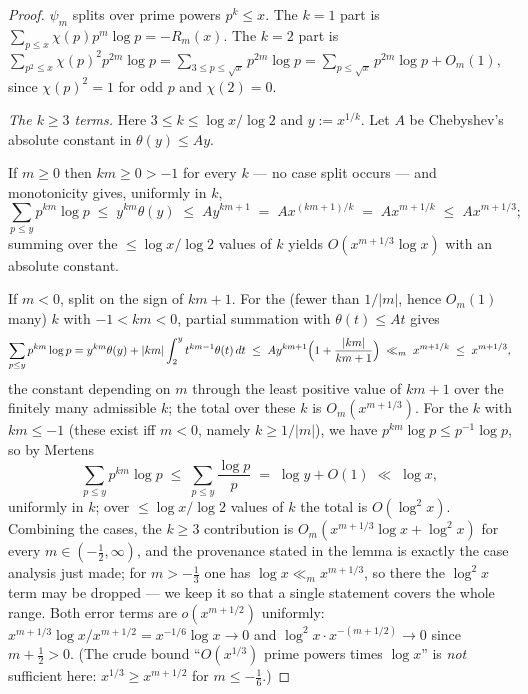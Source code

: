 \begin{proof}
$\psi_m$ splits over prime powers $p^k\le x$. The $k=1$ part is
$\sum_{p\le x}\chi(p)p^m\log p=-R_m(x)$. The $k=2$ part is
$\sum_{p^2\le x}\chi(p)^2p^{2m}\log p=\sum_{3\le p\le\sqrt x}p^{2m}\log p
=\sum_{p\le\sqrt x}p^{2m}\log p+O_m(1)$, since $\chi(p)^2=1$ for odd
$p$ and $\chi(2)=0$.

\emph{The $k\ge3$ terms.} Here $3\le k\le\log x/\log2$ and
$y:=x^{1/k}$. Let $A$ be Chebyshev's absolute constant in
$\theta(y)\le Ay$.

If $m\ge0$ then $km\ge0>-1$ for every $k$ --- no case split occurs ---
and monotonicity gives, uniformly in $k$,
\[
\sum_{p\le y}p^{km}\log p\;\le\;y^{km}\theta(y)\;\le\;Ay^{km+1}
\;=\;Ax^{(km+1)/k}\;=\;Ax^{m+1/k}\;\le\;Ax^{m+1/3};
\]
summing over the $\le\log x/\log2$ values of $k$ yields
$O(x^{m+1/3}\log x)$ with an absolute constant.

If $m<0$, split on the sign of $km+1$. For the (fewer than $1/|m|$,
hence $O_m(1)$ many) $k$ with $-1<km<0$, partial summation with
$\theta(t)\le At$ gives
\[
\sum_{p\le y}p^{km}\log p
=y^{km}\theta(y)+|km|\int_2^y t^{km-1}\theta(t)\,dt
\;\le\;Ay^{km+1}\Bigl(1+\frac{|km|}{km+1}\Bigr)
\;\ll_m\;x^{m+1/k}\;\le\;x^{m+1/3},
\]
the constant depending on $m$ through the least positive value of
$km+1$ over the finitely many admissible $k$; the total over these $k$
is $O_m(x^{m+1/3})$. For the $k$ with $km\le-1$ (these exist iff
$m<0$, namely $k\ge1/|m|$), we have $p^{km}\log p\le p^{-1}\log p$, so
by Mertens
\[
\sum_{p\le y}p^{km}\log p\;\le\;\sum_{p\le y}\frac{\log p}{p}
\;=\;\log y+O(1)\;\ll\;\log x ,
\]
uniformly in $k$; over $\le\log x/\log2$ values of $k$ the total is
$O(\log^2x)$. Combining the cases, the $k\ge3$ contribution is
$O_m(x^{m+1/3}\log x+\log^2x)$ for every $m\in(-\tfrac12,\infty)$, and
the provenance stated in the lemma is exactly the case analysis just
made; for $m>-\tfrac13$ one has $\log x\ll_m x^{m+1/3}$, so there the
$\log^2x$ term may be dropped --- we keep it so that a single statement
covers the whole range. Both error terms are $o(x^{m+1/2})$ uniformly:
$x^{m+1/3}\log x/x^{m+1/2}=x^{-1/6}\log x\to0$ and
$\log^2x\cdot x^{-(m+1/2)}\to0$ since $m+\tfrac12>0$. (The crude bound
``$O(x^{1/3})$ prime powers times $\log x$'' is \emph{not} sufficient
here: $x^{1/3}\ge x^{m+1/2}$ for $m\le-\tfrac16$.)


\end{proof}
